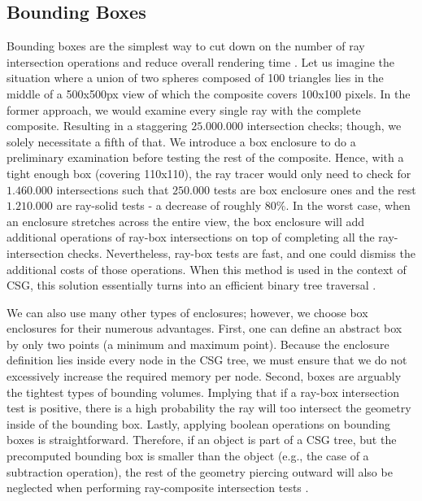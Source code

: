 \documentclass[a4paper,11pt,oneside]{article}
\begin{document}
\subsection{Bounding Boxes}
\label{section:bounding-boxes-optimization}

Bounding boxes are the simplest way to cut down on the number of ray intersection operations and reduce overall rendering time \cite{efficient_csg_meshes}. Let us imagine the situation where a union of two spheres composed of 100 triangles lies in the middle of a 500x500px view of which the composite covers 100x100 pixels. In the former approach, we would examine every single ray with the complete composite. Resulting in a staggering $25.000.000$ intersection checks; though,  we solely necessitate a fifth of that. We introduce a box enclosure to do a preliminary examination before testing the rest of the composite. Hence, with a tight enough box (covering 110x110), the ray tracer would only need to check for $1.460.000$ intersections such that $250.000$ tests are box enclosure ones and the rest $1.210.000$ are ray-solid tests - a decrease of roughly $80\%$. In the worst case, when an enclosure stretches across the entire view, the box enclosure will add additional operations of ray-box intersections on top of completing all the ray-intersection checks. Nevertheless, ray-box tests are fast, and one could dismiss the additional costs of those operations. When this method is used in the context of CSG, this solution essentially turns into an efficient binary tree traversal \cite{ROTH1982109}. 

We can also use many other types of enclosures; however, we choose box enclosures for their numerous advantages. First, one can define an abstract box by only two points (a minimum and maximum point). Because the enclosure definition lies inside every node in the CSG tree, we must ensure that we do not excessively increase the required memory per node. Second, boxes are arguably the tightest types of bounding volumes. Implying that if a ray-box intersection test is positive, there is a high probability the ray will too intersect the geometry inside of the bounding box. Lastly, applying boolean operations on bounding boxes is straightforward. Therefore, if an object is part of a CSG tree, but the precomputed bounding box is smaller than the object (e.g., the case of a subtraction operation), the rest of the geometry piercing outward will also be neglected when performing ray-composite intersection tests \cite{ROTH1982109}.
\end{document}
